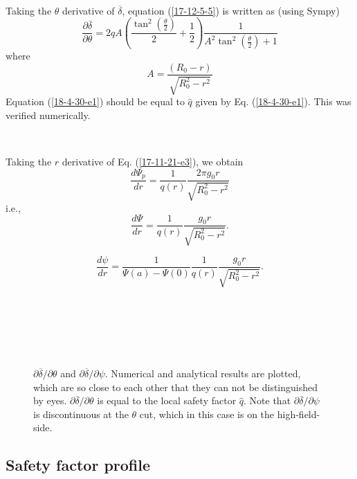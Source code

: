 \documentclass{llncs}
\begin{document}
\

Taking the $\theta$ derivative of $\overline{\delta}$, equation
(\ref{17-12-5-5}) is written as (using Sympy)
\begin{equation}
  \frac{\partial \overline{\delta}}{\partial \theta} = 2 q A \left(
  \frac{\tan^2 \left( \frac{\theta}{2} \right)}{2} + \frac{1}{2} \right)
  \frac{1}{A^2 \tan^2 \left( \frac{\theta}{2} \right) + 1}
\end{equation}
where
\begin{equation}
  A = \frac{(R_0 - r)}{\sqrt{R_0^2 - r^2}}
\end{equation}
Equation (\ref{18-4-30-e1}) should be equal to $\hat{q}$ given by Eq.
(\ref{18-4-30-e1}). This was verified numerically.

\

Taking the $r$ derivative of Eq. (\ref{17-11-21-e3}), we obtain
\begin{equation}
  \frac{d \Psi_p}{d r} = \frac{1}{q (r)}  \frac{2 \pi g_0 r}{\sqrt{R_0^2 -
  r^2}}
\end{equation}
i.e.,
\begin{equation}
  \frac{d \Psi}{d r} = \frac{1}{q (r)}  \frac{g_0 r}{\sqrt{R_0^2 - r^2}} .
\end{equation}

\begin{equation}
  \frac{d \psi}{d r} = \frac{1}{\Psi (a) - \Psi (0)}  \frac{1}{q (r)} 
  \frac{g_0 r}{\sqrt{R_0^2 - r^2}} .
\end{equation}


\

\

\begin{figure}[h]
  
  \
  \caption{$\partial \overline{\delta} / \partial \theta$ and $\partial
  \overline{\delta} / \partial \psi$. Numerical and analytical results are
  plotted, which are so close to each other that they can not be distinguished
  by eyes. $\partial \overline{\delta} / \partial \theta$ is equal to the
  local safety factor $\hat{q}$. Note that $\partial \overline{\delta} /
  \partial \psi$ is discontinuous at the $\theta$ cut, which in this case is
  on the high-field-side.}
\end{figure}

\subsection{Safety factor profile}
\end{document}
